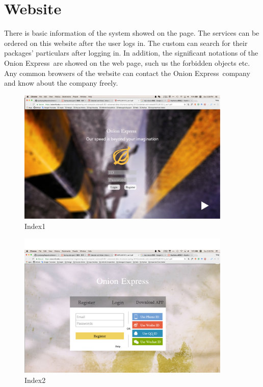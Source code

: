 \documentclass[12pt]{scrreprt}
\begin{document}
\section{Website}
There is basic information of the system showed on the page. The services can be ordered on this website after the user logs in. The custom can search for their packages' particulars after logging in. In addition, the significant notations of the Onion Express\textregistered\ are showed on the web page, such us the forbidden objects etc. Any common browsers of the website can contact the Onion Express\textregistered\ company and know about the company freely.
\begin{figure}[htbp]
  \centering\includegraphics[width=4in]{DocumentRes/index1.png}
  \caption{Index1}
\end{figure}
\begin{figure}[htbp]
  \centering\includegraphics[width=4in]{DocumentRes/index2.png}
  \caption{Index2}
\end{figure}
\end{document}
